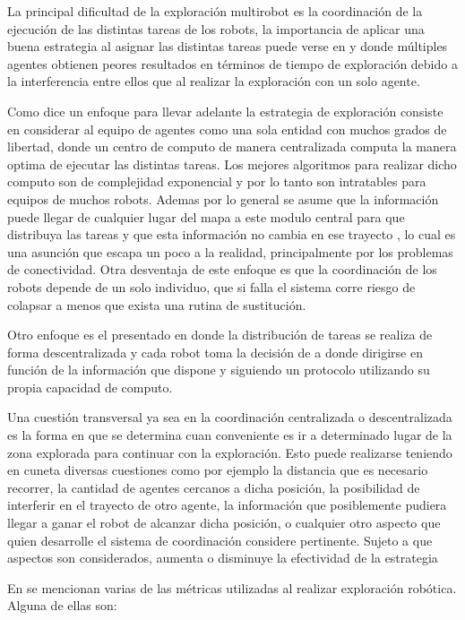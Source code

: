 \documentclass[runningheads]{llncs}
\begin{document}
La principal dificultad de la exploración multirobot es la coordinación de la ejecución de las distintas tareas de los robots\cite{war}, la importancia de aplicar una buena estrategia al asignar las distintas tareas puede verse en\cite{fontan} y \cite{tool} donde múltiples agentes obtienen peores resultados en términos de tiempo de exploración debido a la interferencia entre ellos que al realizar la exploración con un solo agente.

Como dice \cite{war} un enfoque para llevar adelante la estrategia de exploración consiste en considerar al equipo de agentes como una sola entidad con muchos grados de libertad, donde un centro de computo de manera centralizada computa la manera optima de ejecutar las distintas tareas. Los mejores algoritmos para realizar dicho computo son de complejidad exponencial y por lo tanto son intratables para equipos de muchos robots. Ademas por lo general se asume que la información puede llegar de cualquier lugar del mapa a este modulo central para que distribuya las tareas y que esta información no cambia en ese trayecto \cite{war}, lo cual es una asunción que escapa un poco a la realidad, principalmente por los problemas de conectividad. Otra desventaja de este enfoque es que la coordinación de los robots depende de un solo individuo, que si falla el sistema corre riesgo de colapsar a menos que exista una rutina de sustitución.

Otro enfoque es el presentado en \cite{otro} donde la distribución de tareas se realiza de forma descentralizada y cada robot toma la decisión de a donde dirigirse en función de la información que dispone y siguiendo un protocolo utilizando su propia capacidad de computo.

Una cuestión transversal ya sea en la coordinación centralizada o descentralizada es la forma en que se determina cuan conveniente es ir a determinado lugar de la zona explorada para continuar con la exploración. Esto puede realizarse teniendo en cuneta diversas cuestiones como por ejemplo la distancia que es necesario recorrer, la cantidad de agentes cercanos a dicha posición, la posibilidad de interferir en el trayecto de otro agente, la información que posiblemente pudiera llegar a ganar el robot de alcanzar dicha posición, o cualquier otro aspecto que quien desarrolle el sistema de coordinación considere pertinente. Sujeto a que aspectos son considerados, aumenta o disminuye la efectividad de la estrategia

En \cite{metricas} se mencionan varias de las métricas utilizadas al realizar exploración robótica. Alguna de ellas son:
\end{document}
